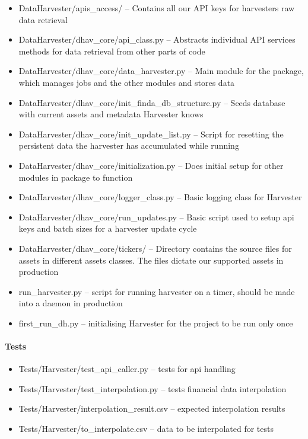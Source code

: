\documentclass[main.tex]{subfiles}
\begin{document}
\begin{itemize}

\item
  DataHarvester/apis\_access/ -- Contains all our API keys for
  harvesters raw data retrieval
\item
  DataHarvester/dhav\_core/api\_class.py -- Abstracts individual API
  services methods for data retrieval from other parts of code
\item
  DataHarvester/dhav\_core/data\_harvester.py -- Main module for the
  package, which manages jobs and the other modules and stores data
\item
  DataHarvester/dhav\_core/init\_finda\_db\_structure.py -- Seeds
  database with current assets and metadata Harvester knows
\item
  DataHarvester/dhav\_core/init\_update\_list.py -- Script for resetting
  the persistent data the harvester has accumulated while running
\item
  DataHarvester/dhav\_core/initialization.py -- Does initial setup for
  other modules in package to function
\item
  DataHarvester/dhav\_core/logger\_class.py -- Basic logging class for
  Harvester
\item
  DataHarvester/dhav\_core/run\_updates.py -- Basic script used to setup
  api keys and batch sizes for a harvester update cycle
\item
  DataHarvester/dhav\_core/tickers/ -- Directory contains the source
  files for assets in different assets classes. The files dictate our
  supported assets in production
\item
  run\_harvester.py -- script for running harvester on a timer, should
  be made into a daemon in production
\item
  first\_run\_dh.py -- initialising Harvester for the project to be run
  only once
\end{itemize}

\paragraph{Tests}\label{tests-1}

\begin{itemize}

\item
  Tests/Harvester/test\_api\_caller.py -- tests for api handling
\item
  Tests/Harvester/test\_interpolation.py -- tests financial data
  interpolation
\item
  Tests/Harvester/interpolation\_result.csv -- expected interpolation
  results
\item
  Tests/Harvester/to\_interpolate.csv -- data to be interpolated for
  tests
\end{itemize}
\end{document}
